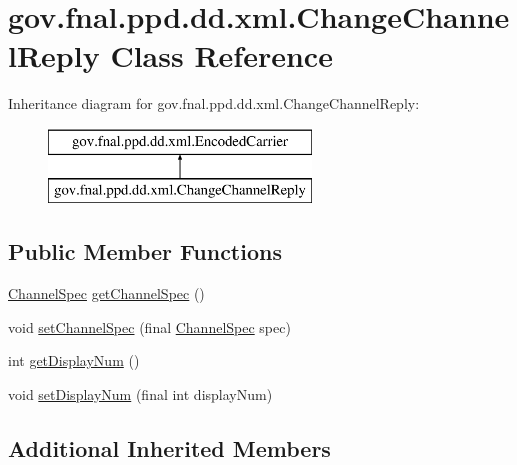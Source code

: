 \hypertarget{classgov_1_1fnal_1_1ppd_1_1dd_1_1xml_1_1ChangeChannelReply}{\section{gov.\-fnal.\-ppd.\-dd.\-xml.\-Change\-Channel\-Reply Class Reference}
\label{classgov_1_1fnal_1_1ppd_1_1dd_1_1xml_1_1ChangeChannelReply}
}
Inheritance diagram for gov.\-fnal.\-ppd.\-dd.\-xml.\-Change\-Channel\-Reply\-:\begin{figure}[H]
\begin{center}
\leavevmode
\includegraphics[height=2.000000cm]{classgov_1_1fnal_1_1ppd_1_1dd_1_1xml_1_1ChangeChannelReply}
\end{center}
\end{figure}
\subsection*{Public Member Functions}
\begin{DoxyCompactItemize}
\item 
\hyperlink{classgov_1_1fnal_1_1ppd_1_1dd_1_1xml_1_1ChannelSpec}{Channel\-Spec} \hyperlink{classgov_1_1fnal_1_1ppd_1_1dd_1_1xml_1_1ChangeChannelReply_a049f748916247f6232c4902a08d87a76}{get\-Channel\-Spec} ()
\item 
void \hyperlink{classgov_1_1fnal_1_1ppd_1_1dd_1_1xml_1_1ChangeChannelReply_a626e5e672e2191972a2a785095b46839}{set\-Channel\-Spec} (final \hyperlink{classgov_1_1fnal_1_1ppd_1_1dd_1_1xml_1_1ChannelSpec}{Channel\-Spec} spec)
\item 
int \hyperlink{classgov_1_1fnal_1_1ppd_1_1dd_1_1xml_1_1ChangeChannelReply_a48ed784b7031bac3d8d42fd90ac7a4b0}{get\-Display\-Num} ()
\item 
void \hyperlink{classgov_1_1fnal_1_1ppd_1_1dd_1_1xml_1_1ChangeChannelReply_a77ff274b50af1b3df5ec003208dc2b4c}{set\-Display\-Num} (final int display\-Num)
\end{DoxyCompactItemize}
\subsection*{Additional Inherited Members}


